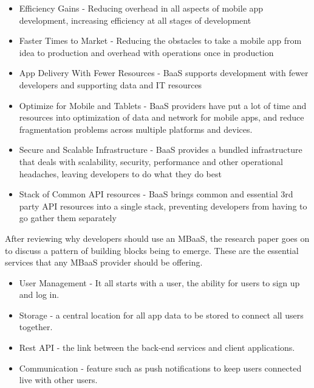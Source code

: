 \begin{itemize}
  \item Efficiency Gains
    - Reducing overhead in all aspects of mobile app development, increasing efficiency at all stages of development
  \item Faster Times to Market
    - Reducing the obstacles to take a mobile app from idea to production and overhead with operations once in production
  \item App Delivery With Fewer Resources
    - BaaS supports development with fewer developers and supporting data and IT resources
  \item Optimize for Mobile and Tablets
    - BaaS providers have put a lot of time and resources into optimization of data and network for mobile apps, and reduce fragmentation problems across multiple platforms and devices.
  \item Secure and Scalable Infrastructure
    -  BaaS provides a bundled infrastructure that deals with scalability, security, performance and other operational headaches, leaving developers to do what they do best
  \item Stack of Common API resources 
    - BaaS brings common and essential 3rd party API resources into a single stack, preventing developers from having to go gather them separately
\end{itemize}

After reviewing why developers should use an MBaaS, the research paper goes on to discuss a pattern of building blocks being to emerge. These are the essential services that any MBaaS provider should be offering.

\begin{itemize}
  \item User Management
    - It all starts with a user, the ability for users to sign up and log in.
  \item Storage
    - a central location for all app data to be stored to connect all users together.
  \item Rest API
    - the link between the back-end services and client applications.
  \item Communication
    - feature such as push notifications to keep users connected live with other users.
\end{itemize}


